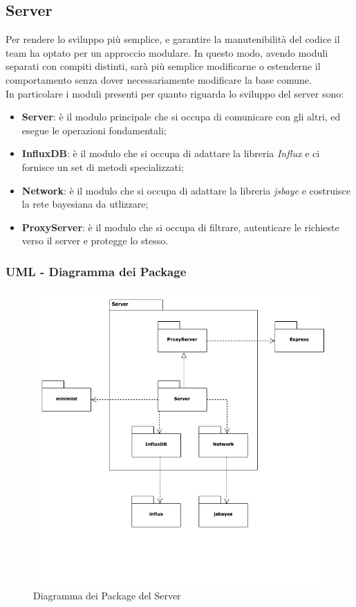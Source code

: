 \subsection{Server}\label{archServer}
Per rendere lo sviluppo più semplice, e garantire la manutenibilità del codice il team ha optato per un approccio modulare. In questo modo, avendo moduli separati con compiti distinti, sarà più semplice modificarne o estenderne il comportamento senza dover necessariamente modificare la base comune.\\
In particolare i moduli presenti per quanto riguarda lo sviluppo del server sono:
\begin{itemize}
	\item \textbf{Server}: è il modulo principale che si occupa di comunicare con gli altri, ed esegue le operazioni fondamentali;
	\item \textbf{InfluxDB}: è il modulo che si occupa di adattare la libreria \textit{Influx} e ci fornisce un set di metodi specializzati;
	\item \textbf{Network}: è il modulo che si occupa di adattare la libreria \textit{jsbaye} e costruisce la rete bayesiana da utlizzare;
	\item \textbf{ProxyServer}: è il modulo che si occupa di filtrare, autenticare le richieste verso il server e  protegge lo stesso.
\end{itemize}


\subsubsection{UML - Diagramma dei Package}
\begin{figure}[H]
	\begin{center}
		\includegraphics[scale=0.6]{./images/serverPackage.png} 
	\end{center}
	\caption{Diagramma dei Package del Server}
\end{figure}

